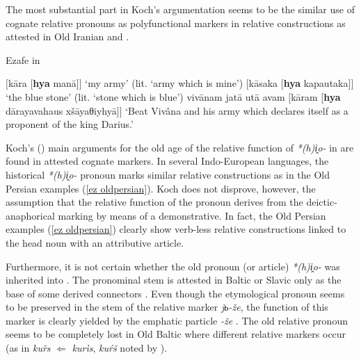 The most substantial part in Koch's argumentation seems to be the similar use of cognate relative pronouns as polyfunctional markers in relative constructions as attested in Old Iranian and .
\begin{exe} \label{ez oldpersian}
\ex \rm{Ezafe in }
\begin{xlist}
\ex	$[$kāra $[$\textbf{hya} manā$]$$]$
\glt	‘my army’ (lit. ‘army which is mine’)
\ex	$[$kāsaka $[$\textbf{hya} kapautaka$]$$]$
\glt	‘the blue stone’ (lit. ‘stone which is blue’)
\ex	vivānam jatā utā avam $[$kāram [\textbf{hya} dārayavahaus xšāyaθiyhyā$]$$]$
\glt	‘Beat Vivâna and his army which declares itself as a proponent of the king Darius.’
\end{xlist}
\end{exe}
Koch's (\citeyear[53, elsewhere]{koch1992}) main arguments for the old age of the relative function of \textit{*(h)i̭o-} in  are found in attested cognate markers. In several Indo-European languages, the historical \textit{*(h)i̭o-} pronoun marks similar relative constructions as in the Old Persian examples (\ref{ez oldpersian}). Koch does not disprove, however, the assumption that the relative function of the pronoun derives from the deictic-anaphorical marking by means of a demonstrative. In fact, the Old Persian examples (\ref{ez oldpersian}) clearly show verb-less relative constructions linked to the head noun with an attributive article.

Furthermore, it is not certain whether the old pronoun (or article) \textit{*(h)i̭o-} was inherited into . The pronominal stem is attested in Baltic or Slavic only as the base of some derived connectors \cite[56]{heinrichs1954}. Even though the etymological pronoun seems to be preserved in the stem of the  relative marker \textit{jь-že}, the function of this marker is clearly yielded by the emphatic particle \textit{-že} \cite[56]{heinrichs1954}. %
 The old relative pronoun seems to be completely lost in Old Baltic where different relative markers occur (as in  \textit{ku\~rs} $\Leftarrow$ \textit{kurìs},  \textit{kuŕš} noted by \citealt[15]{schmidt1959}).

